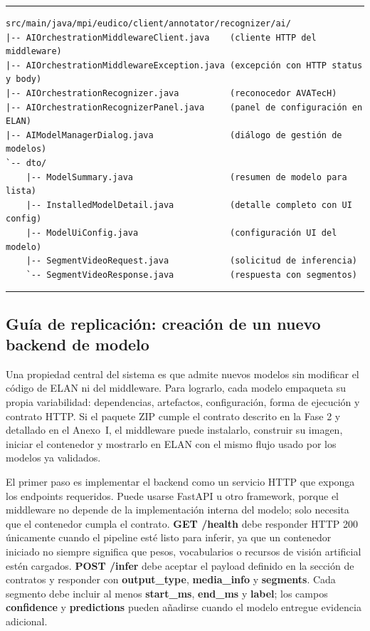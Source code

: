 \begin{center}
\begin{minipage}{0.96\textwidth}
\hrule
\vspace{0.10cm}
\scriptsize
\begin{Verbatim}[baselinestretch=0.72]
src/main/java/mpi/eudico/client/annotator/recognizer/ai/
|-- AIOrchestrationMiddlewareClient.java    (cliente HTTP del middleware)
|-- AIOrchestrationMiddlewareException.java (excepción con HTTP status y body)
|-- AIOrchestrationRecognizer.java          (reconocedor AVATecH)
|-- AIOrchestrationRecognizerPanel.java     (panel de configuración en ELAN)
|-- AIModelManagerDialog.java               (diálogo de gestión de modelos)
`-- dto/
    |-- ModelSummary.java                   (resumen de modelo para lista)
    |-- InstalledModelDetail.java           (detalle completo con UI config)
    |-- ModelUiConfig.java                  (configuración UI del modelo)
    |-- SegmentVideoRequest.java            (solicitud de inferencia)
    `-- SegmentVideoResponse.java           (respuesta con segmentos)
\end{Verbatim}
\vspace{0.03cm}
\hrule

\label{lst:estructura_clases_elan}
\end{minipage}
\end{center}

\vspace{1\baselineskip}

\subsection{Guía de replicación: creación de un nuevo backend de modelo}

Una propiedad central del sistema es que admite nuevos modelos sin modificar el código de ELAN ni del middleware. Para lograrlo, cada modelo empaqueta su propia variabilidad: dependencias, artefactos, configuración, forma de ejecución y contrato HTTP. Si el paquete ZIP cumple el contrato descrito en la Fase 2 y detallado en el Anexo~I, el middleware puede instalarlo, construir su imagen, iniciar el contenedor y mostrarlo en ELAN con el mismo flujo usado por los modelos ya validados.

El primer paso es implementar el backend como un servicio HTTP que exponga los endpoints requeridos. Puede usarse FastAPI u otro framework, porque el middleware no depende de la implementación interna del modelo; solo necesita que el contenedor cumpla el contrato. \textbf{GET /health} debe responder HTTP 200 únicamente cuando el pipeline esté listo para inferir, ya que un contenedor iniciado no siempre significa que pesos, vocabularios o recursos de visión artificial estén cargados. \textbf{POST /infer} debe aceptar el payload definido en la sección de contratos y responder con \textbf{output\_type}, \textbf{media\_info} y \textbf{segments}. Cada segmento debe incluir al menos \textbf{start\_ms}, \textbf{end\_ms} y \textbf{label}; los campos \textbf{confidence} y \textbf{predictions} pueden añadirse cuando el modelo entregue evidencia adicional.


